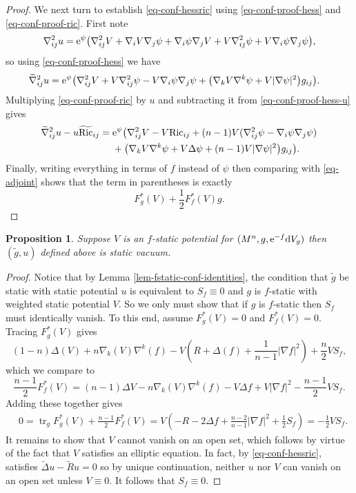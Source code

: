 \documentclass[10pt,a4paper]{amsart}
\numberwithin{equation}{section}
\newtheorem{Proposition}[Theorem]{Proposition}
\theoremstyle{definition}
\begin{document}
\begin{proof}
	We next turn to establish \eqref{eq-conf-hessric} using \eqref{eq-conf-proof-hess} and \eqref{eq-conf-proof-ric}. First note
	\[
	\nabla_{ij}^2 u
	={\rm e}^{\psi}\bigl(\nabla_{ij}^2 V + \nabla_iV \nabla_j\psi + \nabla_i\psi \nabla_jV + V\nabla_{ij}^2\psi + V \nabla_i\psi \nabla_j\psi\bigr),
	\]
	so using \eqref{eq-conf-proof-hess} we have
	\begin{align}
		\widetilde\nabla_{ij}^2 u
		&={\rm e}^{\psi}\bigl(\nabla_{ij}^2 V + V\nabla_{ij}^2\psi - V \nabla_i\psi\nabla_j \psi
		+\big(\nabla_k V \nabla^k\psi+V|\nabla\psi|^2\big)g_{ij}\bigr). \label{eq-conf-proof-hess-u}
	\end{align}
	Multiplying \eqref{eq-conf-proof-ric} by $u$ and subtracting it from \eqref{eq-conf-proof-hess-u} gives
	\begin{align*}
		\widetilde\nabla_{ij}^2 u-u \widetilde{\mathrm{Ric}}_{ij}
={}&{\rm e}^{\psi}\bigl(\nabla_{ij}^2 V - V\mathrm{Ric}_{ij}
		+(n-1)V(\nabla_{ij}^2\psi-\nabla_i\psi \nabla_j\psi) \nonumber\\
		&
		+\big(\nabla_k V \nabla^k\psi+V\Delta\psi+(n-1)V|\nabla\psi|^2\big)g_{ij}\bigr). \label{eq-conf-proof-hessric-new}
	\end{align*}
	Finally, writing everything in terms of $f$ instead of $\psi$ then comparing with \eqref{eq-adjoint} shows that the term in parentheses is exactly
	\[
	F_g^*(V)+\frac12 F_f^*(V) g. \tag*{\qed}
	\]
\renewcommand{\qed}{}
\end{proof}


\begin{Proposition}\label{prop-fstatic-to-static}
	Suppose $V$ is an $f$-static potential for $(M^n,g,{\rm e}^{-f}{\rm d}V_g)$ then $(\widetilde g,u)$ defined above is static vacuum.
\end{Proposition}

\begin{proof}
	Notice that by Lemma \ref{lem-fstatic-conf-identities}, the condition that $\widetilde g$ be static with static potential $u$ is equivalent to $S_f\equiv0$ and $g$ is $f$-static with weighted static potential $V$. So we only must show that if $g$ is $f$-static then $S_f$ must identically vanish. To this end, assume $F_g^*(V)=0$ and $F_f^*(V)=0$. Tracing $F_g^*(V)$ gives
	\[
	(1-n)\Delta(V)+n\nabla_k(V)\nabla^k(f)-V\left(R+\Delta(f)+\frac{1}{n-1}|\nabla f|^2\right)+\frac{n}{2}VS_f,
	\]
	which we compare to
	\[
	\frac{n-1}{2}F_f^*(V)=(n-1)\Delta V-n\nabla_k(V)\nabla^k(f)-V\Delta f+V|\nabla f|^2-\frac{n-1}{2}V S_f.
	\]
	Adding these together gives
	\begin{align*}
	&	0=\operatorname{tr}_g F_g^*(V)+\frac{n-1}{2}F_f^*(V)
		 =V\left(-R-2\Delta f+\frac{n-2}{n-1}|\nabla f|^2+\frac{1}{2}S_f \right)
		 =-\frac12 V S_f.
	\end{align*}
	It remains to show that $V$ cannot vanish on an open set, which follows by virtue of the fact that $V$ satisfies an elliptic equation. In fact, by \eqref{eq-conf-hessric},  satisfies $\widetilde \Delta u-\widetilde R u=0$ so by unique continuation, neither $u$ nor $V$ can vanish on an open set unless $V\equiv0$. It follows that $S_f\equiv0$.
\end{proof}
\end{document}
